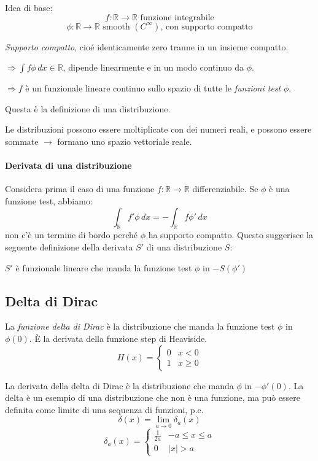 \documentclass[a4paper,11pt]{report}
\newcommand{\R}{\mathbb{R}}
\begin{document}
\medskip
Idea di base:
\[
f:\R\rightarrow\R \text{ funzione integrabile}
\]
\[
\phi : \R \rightarrow \R \text{ smooth $\left(C^{\infty}\right)$, con supporto compatto} 
\]

\emph{Supporto compatto}, cio\'e identicamente zero tranne in un insieme compatto.

\smallskip

$\Rightarrow \int f \phi \, dx \in \mathbb{R}$, dipende linearmente e in un modo continuo da $\phi$.

\smallskip

$\Rightarrow f$ \`e un funzionale lineare continuo sullo spazio di tutte le \emph{funzioni test} $\phi.$

\smallskip

Questa \`e la definizione di una distribuzione.

Le distribuzioni possono essere moltiplicate con dei numeri reali, e possono essere sommate $\rightarrow$ formano uno spazio vettoriale reale.

\paragraph{Derivata di una distribuzione}

Considera prima il caso di una funzione $f:\R \rightarrow \R$ differenziabile. Se $\phi$ \`e una funzione test, abbiamo:
\[
\int_{\R}f'\phi \,dx = -\int_{\R}f\phi ' \,dx
\]
non c'\`e un termine di bordo perch\'e $\phi $ ha supporto compatto. 
Questo suggerisce la seguente definizione della derivata $S'$ di una distribuzione $S$:

$S'$ \`e funzionale lineare che manda la funzione test $\phi$ in $-S\left(\phi'\right)$

\subsection{Delta di Dirac}
La \emph{funzione delta di Dirac} \`e la distribuzione che manda la funzione test $\phi$ in $\phi(0)$. \`E la derivata della funzione step di Heaviside.
\[
H(x)=\begin{cases}
0 & x < 0 \\
1 & x \geq 0
\end{cases}
\]

La derivata della delta di Dirac \`e la distribuzione che manda $\phi$ in $-\phi '(0)$. La delta \`e un esempio di una distribuzione che non \`e una funzione, ma pu\`o essere definita come limite di una sequenza di funzioni, p.e.
\[
\delta\left(x\right) = \lim_{a\to 0}\delta_a\left(x\right)
\]
\[
\delta_a(x) = \begin{cases}
\frac{1}{2a} & -a\leq x\leq a\\
0 & |x| > a
\end{cases}
\]
\end{document}
